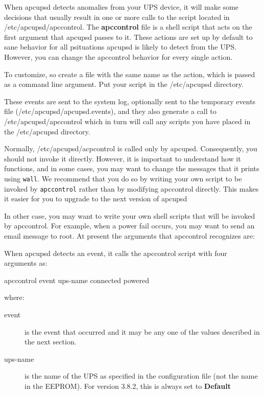 {{{{{{{{{\label{index-Event-handling-150}
\label{index-Customizing-event-handling-151}

When apcupsd detects anomalies from your UPS device, it will make some
decisions that usually result in one or more calls to the script located in
/etc/apcupsd/apccontrol. The {\bf apccontrol} file is a shell script that acts
on the first argument that apcupsd passes to it. These actions are set up by
default to sane behavior for all psituations apcupsd is likely to detect from
the UPS. However, you can change the apccontrol behavior for every single
action.  

To customize, so create a file with the same name as the action, which is
passed as a command line argument. Put your script in the /etc/apcupsd
directory.  

These events are sent to the system log, optionally sent to the temporary
events file (/etc/apcupsd/apcupsd.events), and they also generate a call to
/etc/apcupsd/apccontrol which in turn will call any scripts you have placed in
the /etc/apcupsd directory.  

Normally, /etc/apcupsd/acpcontrol is called only by apcupsd. Consequently, you
should not invoke it directly.  However, it is important to understand how it
functions, and in some cases, you may want to change the messages that it
prints using {\tt wall}. We recommend that you do so by writing your own
script to be invoked by {\tt apccontrol} rather than by modifying apccontrol
directly. This makes it easier for you to upgrade to the next version of
apcupsd  

In other case, you may want to write your own shell scripts that will be
invoked by apccontrol. For example, when a power fail occurs, you may want to
send an email message to root. At present the arguments that apccontrol
recognizes are:  

When apcupsd detects an event, it calls the apccontrol script with four
arguments as:  

apccontrol \lt{}event\gt{} \lt{}ups-name\gt{} \lt{}connected\gt{}
\lt{}powered\gt{}  

where:  

\begin{description}

\item [event]
   is the event that occurred and it may be any one of the values described in
the next section.  

\item [ups-name]
   is the name of the UPS as specified in the configuration file (not the name in
the EEPROM). For version 3.8.2, this is always set to {\bf Default}  


\end{description}}}}}}}}}}
